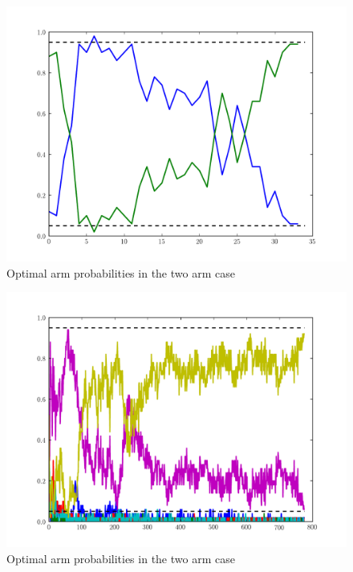 \begin{figure}\label{fig:weights1}
\begin{center}
        \includegraphics[scale=0.4]{./Applications/MarkDecProc/weights1.pdf}
        \caption{Optimal arm probabilities in the two arm case}
\end{center}
\end{figure}

\begin{figure}\label{fig:weights2}
\begin{center}
        \includegraphics[scale=0.4]{./Applications/MarkDecProc/weights2.pdf}
        \caption{Optimal arm probabilities in the two arm case}
\end{center}
\end{figure}



